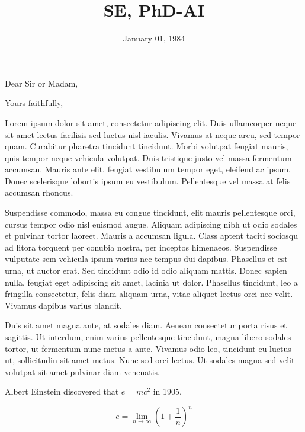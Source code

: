 \documentclass[11pt,a4paper,sans]{moderncv}
\title{SE, PhD-AI}
\begin{document}
\date{January 01, 1984}
\opening{Dear Sir or Madam,}
\closing{Yours faithfully,}
\makelettertitle

Lorem ipsum dolor sit amet, consectetur adipiscing elit. Duis ullamcorper neque sit amet lectus facilisis sed luctus nisl iaculis. Vivamus at neque arcu, sed tempor quam. Curabitur pharetra tincidunt tincidunt. Morbi volutpat feugiat mauris, quis tempor neque vehicula volutpat. Duis tristique justo vel massa fermentum accumsan. Mauris ante elit, feugiat vestibulum tempor eget, eleifend ac ipsum. Donec scelerisque lobortis ipsum eu vestibulum. Pellentesque vel massa at felis accumsan rhoncus.

Suspendisse commodo, massa eu congue tincidunt, elit mauris pellentesque orci, cursus tempor odio nisl euismod augue. Aliquam adipiscing nibh ut odio sodales et pulvinar tortor laoreet. Mauris a accumsan ligula. Class aptent taciti sociosqu ad litora torquent per conubia nostra, per inceptos himenaeos. Suspendisse vulputate sem vehicula ipsum varius nec tempus dui dapibus. Phasellus et est urna, ut auctor erat. Sed tincidunt odio id odio aliquam mattis. Donec sapien nulla, feugiat eget adipiscing sit amet, lacinia ut dolor. Phasellus tincidunt, leo a fringilla consectetur, felis diam aliquam urna, vitae aliquet lectus orci nec velit. Vivamus dapibus varius blandit.

Duis sit amet magna ante, at sodales diam. Aenean consectetur porta risus et sagittis. Ut interdum, enim varius pellentesque tincidunt, magna libero sodales tortor, ut fermentum nunc metus a ante. Vivamus odio leo, tincidunt eu luctus ut, sollicitudin sit amet metus. Nunc sed orci lectus. Ut sodales magna sed velit volutpat sit amet pulvinar diam venenatis.

Albert Einstein discovered that $e=mc^2$ in 1905.

\[ e=\lim_{n \to \infty} \left(1+\frac{1}{n}\right)^n \]

\makeletterclosing

\clearpage






\makecvtitle
\end{document}
